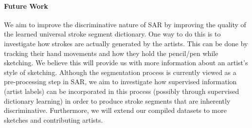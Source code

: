\paragraph{Future Work} We aim to improve the discriminative nature of SAR by improving the quality of the learned universal stroke segment dictionary. One way to do this is to investigate how strokes are actually generated by the artists. This can be done by tracking their hand movements and how they hold the pencil/pen while sketching. We believe this will provide us with more information about an artist's style of sketching. Although the segmentation process is currently viewed as a pre-processing step in SAR, we aim to investigate how supervised information (artist labels) can be incorporated in this process (possibly through supervised dictionary learning) in order to produce stroke segments that are inherently discriminative. Furthermore, we will extend our compiled datasets to more sketches and contributing artists.






